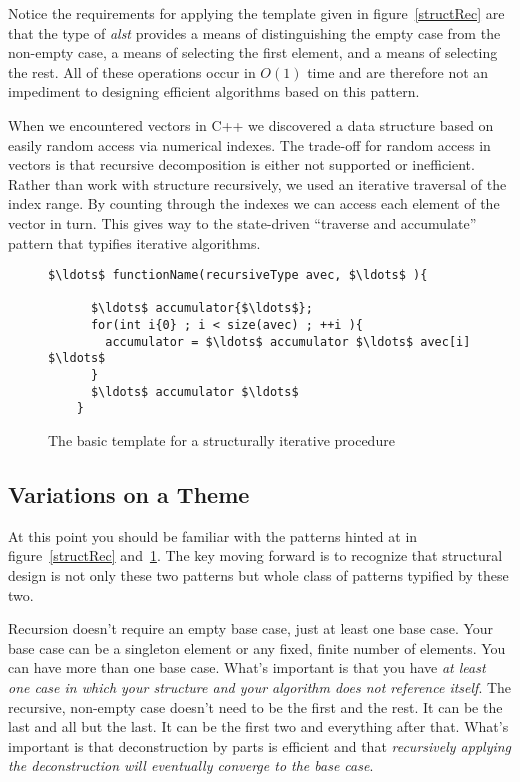 \documentclass[nobib]{tufte-handout}
\begin{document}
Notice the requirements for applying the template given in figure~\ref{structRec} are that the type of \textit{alst} provides a means of distinguishing the empty case from the non-empty case, a means of selecting the first element, and a means of selecting the rest. All of these operations occur in $O(1)$ time and are therefore not an impediment to designing efficient algorithms based on this pattern.

When we encountered vectors in C++ we discovered a data structure based on easily random access via numerical indexes. The trade-off for random access in vectors is that recursive decomposition is either not supported or inefficient. Rather than work with structure recursively, we used an iterative traversal of the index range.  By counting through the indexes we can access each element of the vector in turn. This gives way to the state-driven ``traverse and accumulate'' pattern that typifies iterative algorithms.

\begin{figure}
  \begin{lstlisting}[mathescape=true]
    $\ldots$ functionName(recursiveType avec, $\ldots$ ){

      $\ldots$ accumulator{$\ldots$};
      for(int i{0} ; i < size(avec) ; ++i ){
        accumulator = $\ldots$ accumulator $\ldots$ avec[i] $\ldots$
      }
      $\ldots$ accumulator $\ldots$
    }
  \end{lstlisting}
\label{structIter}
\caption{The basic template for a structurally iterative procedure}
\end{figure}

\subsection{Variations on a Theme}

At this point you should be familiar with the patterns hinted at in figure~\ref{structRec} and~\ref{structIter}. The key moving forward is to recognize that structural design is not only these two patterns but whole class of patterns typified by these two.

Recursion doesn't require an empty base case, just at least one base case. Your base case can be a singleton element or any fixed, finite number of elements. You can have more than one base case. What's important is that you have \textit{at least one case in which your structure and your algorithm does not reference itself}. The recursive, non-empty case doesn't need to be the first and the rest. It can be the last and all but the last. It can be the first two and everything after that. What's important is that deconstruction by parts is efficient and that \textit{recursively applying the deconstruction will eventually converge to the base case}.
\end{document}
